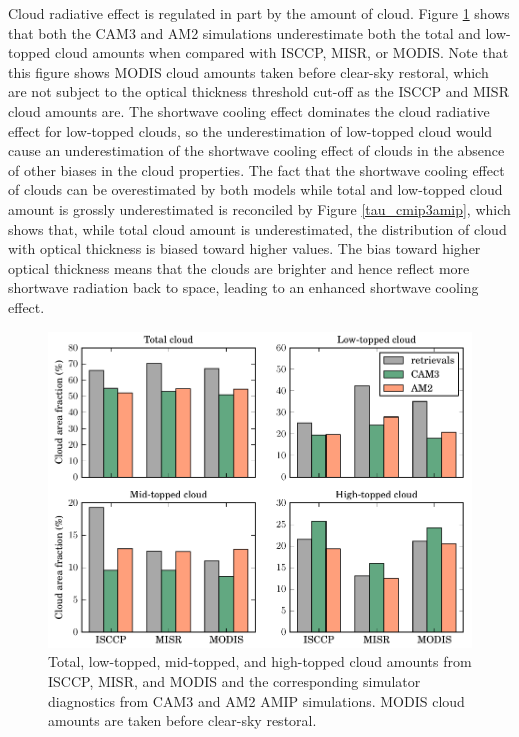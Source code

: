 Cloud radiative effect is regulated in part by the amount of cloud. Figure \ref{cldtypes_cmip3amip_bar} shows that both the CAM3 and AM2 simulations underestimate both the total and low-topped cloud amounts when compared with ISCCP, MISR, or MODIS. Note that this figure shows MODIS cloud amounts taken before clear-sky restoral, which are not subject to the optical thickness threshold cut-off as the ISCCP and MISR cloud amounts are. The shortwave cooling effect dominates the cloud radiative effect for low-topped clouds, so the underestimation of low-topped cloud would cause an underestimation of the shortwave cooling effect of clouds in the absence of other biases in the cloud properties. The fact that the shortwave cooling effect of clouds can be overestimated by both models while total and low-topped cloud amount is grossly underestimated is reconciled by Figure \ref{tau_cmip3amip}, which shows that, while total cloud amount is underestimated, the distribution of cloud with optical thickness is biased toward higher values. The bias toward higher optical thickness means that the clouds are brighter and hence reflect more shortwave radiation back to space, leading to an enhanced shortwave cooling effect.
\begin{figure}
    \centering
    \includegraphics{../graphics/cldtypes_cmip3amip_bar.pdf} 
    \caption[Total, low-topped, mid-topped, and high-topped cloud amounts from ISCCP, MISR, and MODIS and the corresponding simulator diagnostics from CAM3 and AM2 AMIP simulations]{Total, low-topped, mid-topped, and high-topped cloud amounts from ISCCP, MISR, and MODIS and the corresponding simulator diagnostics from CAM3 and AM2 AMIP simulations. MODIS cloud amounts are taken before clear-sky restoral.}
    \label{cldtypes_cmip3amip_bar}
\end{figure}

